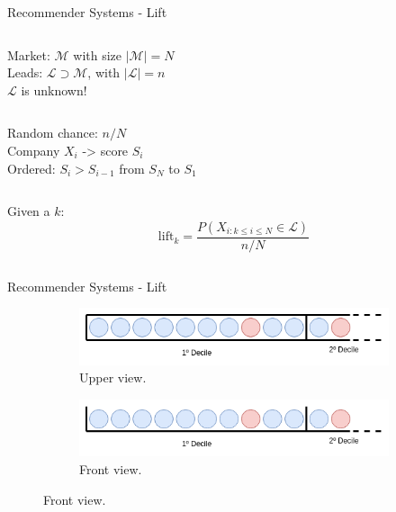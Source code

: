 \begin{frame}{Recommender Systems - Lift} \pause
    \begin{column}{.5\textwidth}
        Market: $\mathcal M$ with size $|\mathcal M |\!=\!N$ \\ \pause
        \vspace{0.25cm}
        Leads: $\mathcal L \supset \mathcal M $, with $|\mathcal L|\!=\!n$ \\ \pause
        \vspace{0.25cm}
        $\mathcal L$ is unknown! \\ \pause
    \end{column}
    \begin{column}{.5\textwidth}
        Random chance: $n/N$ \\ \pause
        \vspace{0.25cm}
        Company $X_i$ -> score $S_i$ \\ \pause
        \vspace{0.25cm}
        Ordered: $S_i>S_{i-1}$ from $S_N$ to $S_1$ \\ \pause
    \end{column}
    \vfill
    \begin{column}{\textwidth}
        Given a $k$: \pause
        \vspace{0.25cm}
        \LARGE{
            \begin{equation*}
                \mathrm{lift}_k = \frac{P(X_{i:k\leq i\leq N}\in \mathcal L)}{n/N}
            \end{equation*}
        }
    \end{column}
\end{frame}


\begin{frame}{Recommender Systems - Lift} \pause
    \begin{figure}
        \caption{Rectangular box with colored balls.} \pause
        \begin{subfigure}{\linewidth}
            \centering
            \includegraphics[width=\linewidth]{fig/ch2-rec-box-upper.png}
            \caption{Upper view.}
        \end{subfigure}
        \begin{subfigure}{\linewidth}
            \centering
            \includegraphics[width=\linewidth]{fig/ch2-rec-box-front.png}
            \caption{Front view.}
        \end{subfigure}
    \end{figure}
\end{frame}

